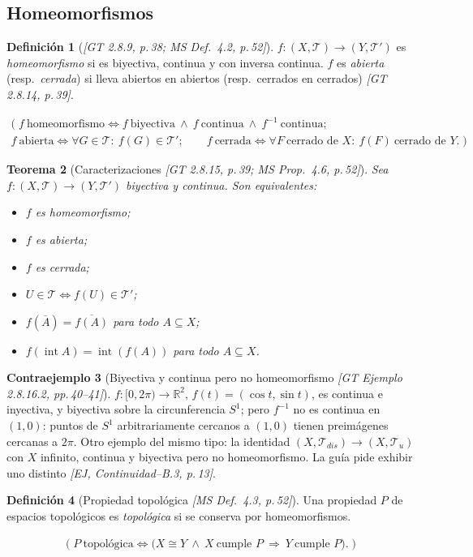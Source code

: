 \documentclass[11pt,a4paper]{article}
\newenvironment{lista}{\leavevmode\begin{itemize}[leftmargin=1.5em,itemsep=1pt,topsep=2pt,parsep=0pt]}{\end{itemize}}
\newcommand{\lgc}[1]{\par\vspace{-3pt}\begin{gather*}\big(\;#1\;\big)\end{gather*}\vspace{-6pt}}
\theoremstyle{definition}
\newtheorem{definicion}{Definición}[section]
\newtheorem{contraejemplo}[definicion]{Contraejemplo}
\theoremstyle{plain}
\newtheorem{teorema}[definicion]{Teorema}
\newcommand{\fnt}[1]{{\normalfont\small\itshape\color{gray!150!black}[#1]}}
\newcommand{\R}{\mathbb{R}}
\newcommand{\cl}[1]{\overline{#1}}
\newcommand{\intr}{\operatorname{int}}
\newcommand{\tp}{\mathcal{T}}
\begin{document}
\subsection{Homeomorfismos}\label{sec:homeo}

\begin{definicion}[\fnt{GT 2.8.9, p.\,38; MS Def.\ 4.2, p.\,52}]
$f:(X,\tp)\to(Y,\tp')$ es \emph{homeomorfismo} si es biyectiva, continua y con inversa continua. $f$ es \emph{abierta} (resp.\ \emph{cerrada}) si lleva abiertos en abiertos (resp.\ cerrados en cerrados) \fnt{GT 2.8.14, p.\,39}.
\lgc{f\ \text{homeomorfismo}\iff f\ \text{biyectiva}\ \wedge\ f\ \text{continua}\ \wedge\ f^{-1}\ \text{continua};\\
f\ \text{abierta}\iff \forall G\in\tp:\ f(G)\in\tp';\qquad
f\ \text{cerrada}\iff \forall F\ \text{cerrado de } X:\ f(F)\ \text{cerrado de } Y.}
\end{definicion}

\begin{teorema}[Caracterizaciones \fnt{GT 2.8.15, p.\,39; MS Prop.\ 4.6, p.\,52}]
Sea $f:(X,\tp)\to(Y,\tp')$ biyectiva y continua. Son equivalentes:
\begin{lista}
\item $f$ es homeomorfismo;
\item $f$ es abierta;
\item $f$ es cerrada;
\item $U\in\tp\iff f(U)\in\tp'$;
\item $f(\cl A)=\cl{f(A)}$ para todo $A\subseteq X$;
\item $f(\intr A)=\intr(f(A))$ para todo $A\subseteq X$.
\end{lista}
\end{teorema}

\begin{contraejemplo}[Biyectiva y continua pero no homeomorfismo \fnt{GT Ejemplo 2.8.16.2, pp.\,40--41}]
$f:[0,2\pi)\to \R^2$, $f(t)=(\cos t,\sin t)$, es continua e inyectiva, y biyectiva sobre la circunferencia $S^1$; pero $f^{-1}$ no es continua en $(1,0)$: puntos de $S^1$ arbitrariamente cercanos a $(1,0)$ tienen preimágenes cercanas a $2\pi$. Otro ejemplo del mismo tipo: la identidad $(X,\tp_{dis})\to(X,\tp_u)$ con $X$ infinito, continua y biyectiva pero no homeomorfismo. La guía pide exhibir uno distinto \fnt{EJ, Continuidad--B.3, p.\,13}.
\end{contraejemplo}


\begin{definicion}[Propiedad topológica \fnt{MS Def.\ 4.3, p.\,52}]
Una propiedad $P$ de espacios topológicos es \emph{topológica} si se conserva por homeomorfismos.
\lgc{P\ \text{topológica}\iff \big(X\cong Y\ \wedge\ X\ \text{cumple } P\ \Rightarrow\ Y\ \text{cumple } P\big).}
\end{definicion}
\end{document}
